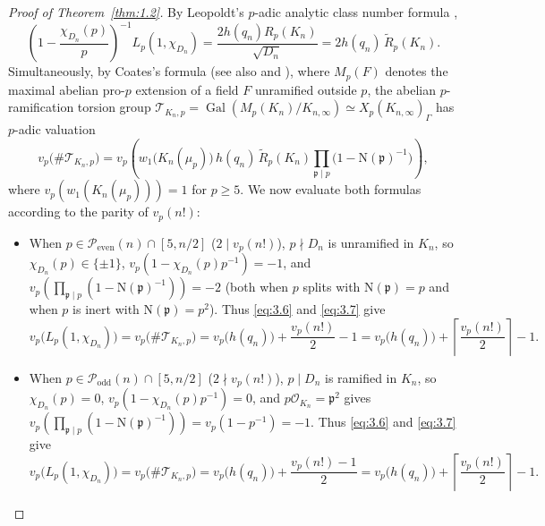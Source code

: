 \documentclass[11pt,reqno]{amsart}
\theoremstyle{remark}
\numberwithin{equation}{section}
\newcommand{\Podd}{\mathcal{P}_{\mathrm{odd}}}
\newcommand{\Peven}{\mathcal{P}_{\mathrm{even}}}
\DeclareMathOperator{\Gal}{Gal}
\begin{document}
\begin{proof}[Proof of Theorem~\ref{thm:1.2}]
By Leopoldt's $p$-adic analytic class number formula \cite[Theorem~5.24]{Washington1997},
\begin{equation}\label{eq:3.7}
\left(1 - \frac{\chi_{D_n}(p)}{p}\right)^{-1} L_p(1, \chi_{D_n}) = \frac{2h(q_n)R_p(K_n)}{\sqrt{D_n}} = 2h(q_n)\,\widetilde{R}_p(K_n).
\end{equation}
Simultaneously, by Coates's formula \cite[Appendix, Lemma~8]{Coates1977} (see also \cite[Proposition~1]{Taya1996} and \cite[Theorem~3.1]{QiStokes2024}), where $M_p(F)$ denotes the maximal abelian pro-$p$ extension of a field $F$ unramified outside $p$, the abelian $p$-ramification torsion group $\mathcal{T}_{K_n, p} = \Gal(M_p(K_n)/K_{n,\infty}) \simeq X_p(K_{n,\infty})_\Gamma$ has $p$-adic valuation
\[
v_p\bigl(\#\mathcal{T}_{K_n, p}\bigr) = v_p\!\left(w_1\bigl(K_n(\mu_p)\bigr)\,h(q_n)\,\widetilde{R}_p(K_n)\prod_{\mathfrak{p} \mid p}\bigl(1 - \mathrm{N}(\mathfrak{p})^{-1}\bigr)\right),
\]
where $v_p(w_1(K_n(\mu_p))) = 1$ for $p \ge 5$. We now evaluate both formulas according to the parity of $v_p(n!)$:
\begin{itemize}
\item When $p \in \Peven(n) \cap [5, n/2]$ ($2 \mid v_p(n!)$), $p \nmid D_n$ is unramified in $K_n$, so $\chi_{D_n}(p) \in \{\pm 1\}$, $v_p(1 - \chi_{D_n}(p)p^{-1}) = -1$, and $v_p(\prod_{\mathfrak{p} \mid p}(1 - \mathrm{N}(\mathfrak{p})^{-1})) = -2$ (both when $p$ splits with $\mathrm{N}(\mathfrak{p}) = p$ and when $p$ is inert with $\mathrm{N}(\mathfrak{p}) = p^2$). Thus \eqref{eq:3.6} and \eqref{eq:3.7} give
\[
v_p\bigl(L_p(1, \chi_{D_n})\bigr) = v_p\bigl(\#\mathcal{T}_{K_n, p}\bigr) = v_p\bigl(h(q_n)\bigr) + \frac{v_p(n!)}{2} - 1 = v_p\bigl(h(q_n)\bigr) + \left\lceil \frac{v_p(n!)}{2} \right\rceil - 1.
\]
\item When $p \in \Podd(n) \cap [5, n/2]$ ($2 \nmid v_p(n!)$), $p \mid D_n$ is ramified in $K_n$, so $\chi_{D_n}(p) = 0$, $v_p(1 - \chi_{D_n}(p)p^{-1}) = 0$, and $p\mathcal{O}_{K_n} = \mathfrak{p}^2$ gives $v_p(\prod_{\mathfrak{p} \mid p}(1 - \mathrm{N}(\mathfrak{p})^{-1})) = v_p(1 - p^{-1}) = -1$. Thus \eqref{eq:3.6} and \eqref{eq:3.7} give
\[
v_p\bigl(L_p(1, \chi_{D_n})\bigr) = v_p\bigl(\#\mathcal{T}_{K_n, p}\bigr) = v_p\bigl(h(q_n)\bigr) + \frac{v_p(n!) - 1}{2} = v_p\bigl(h(q_n)\bigr) + \left\lceil \frac{v_p(n!)}{2} \right\rceil - 1.
\]
\end{itemize}

\end{proof}
\end{document}
